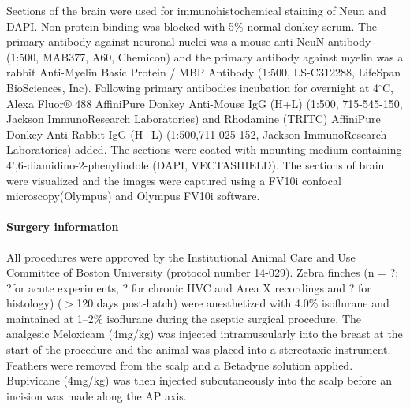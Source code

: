 \documentclass[10pt,letterpaper]{article}
\let\oldmarginpar\marginpar
\renewcommand{\marginpar}[1]{\oldmarginpar{\linespread{1}\scriptsize{#1}}}
\renewcommand{\subsubsection}[1]{\paragraph{#1}}
\begin{document}
Sections of the brain were used for immunohistochemical staining of
Neun and DAPI. Non protein binding was blocked with 5\% normal donkey
serum. The primary antibody against neuronal nuclei was a mouse
anti-NeuN antibody (1:500, MAB377, A60, Chemicon) and the primary
antibody against myelin was a rabbit Anti-Myelin Basic Protein / MBP
Antibody (1:500, LS-C312288, LifeSpan BioSciences, Inc). Following
primary antibodies incubation for overnight at 4$^\circ$C, Alexa
Fluor® 488 AffiniPure Donkey Anti-Mouse IgG (H+L) (1:500, 715-545-150,
Jackson ImmunoResearch Laboratories) and Rhodamine (TRITC) AffiniPure
Donkey Anti-Rabbit IgG (H+L) (1:500,711-025-152, Jackson
ImmunoResearch Laboratories) added. The sections were coated with
mounting medium containing 4',6-diamidino-2-phenylindole (DAPI,
VECTASHIELD).  The sections of brain were visualized and the images
were captured using a FV10i confocal microscopy(Olympus) and Olympus
FV10i software.

\subsubsection{Surgery information}

All procedures were approved by the Institutional Animal Care and Use
Committee of Boston University (protocol number 14-029). Zebra finches
\marginpar{Jun?} (n = ?; ?for acute experiments, ? for chronic HVC and Area X
recordings and ? for histology) ($>$120 days post-hatch) were
anesthetized with 4.0\% isoflurane and maintained at 1--2\% isoflurane
during the aseptic surgical procedure. The analgesic Meloxicam
(4mg/kg) was injected intramuscularly into the breast at the start of
the procedure and the animal was placed into a stereotaxic
instrument. Feathers were removed from the scalp and a Betadyne
solution applied. Bupivicane (4mg/kg) was then injected subcutaneously
into the scalp before an incision was made along the AP axis.
\end{document}
